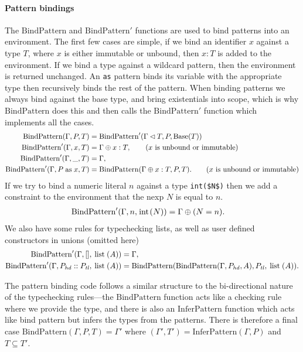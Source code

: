\paragraph{Pattern bindings} The $\mathrm{BindPattern}$ and $\mathrm{BindPattern}'$ functions are used to bind patterns into an environment. The first few cases are simple, if we bind an identifier $x$ against a type $T$, where $x$ is either immutable or unbound, then $x : T$ is added to the environment. If we bind a type against a wildcard pattern, then the environment is returned unchanged. An \lstinline+as+ pattern binds its variable with the appropriate type then recursively binds the rest of the pattern. When binding patterns we always bind against the base type, and bring existentials into scope, which is why $\mathrm{BindPattern}$ does this and then calls the $\mathrm{BindPattern}'$ function which implements all the cases.
\begin{align*}
  \mathrm{BindPattern}(\Gamma, P, T) &= \mathrm{BindPattern}'(\Gamma \lhd T, P, \mathrm{Base}(T))\\
  \mathrm{BindPattern}'(\Gamma, x, T) &= \Gamma \oplus x : T, \tag{$x$ is unbound or immutable}\\
  \mathrm{BindPattern}'(\Gamma, \msail{_}, T) &= \Gamma,\\
  \mathrm{BindPattern}'(\Gamma, \msail{$P\;$ as $\;x$}, T) &= \mathrm{BindPattern}(\Gamma \oplus x : T, P, T). \tag{$x$ is unbound or immutable}
\end{align*}
If we try to bind a numeric literal $n$ against a type
\lstinline[mathescape]+int($N$)+ then we add a constraint to the
environment that the nexp $N$ is equal to $n$.
\begin{align*}
\mathrm{BindPattern}'(\Gamma, n, \msail{int($N$)}) &= \Gamma \oplus (N = n).
\end{align*}
We also have some rules for typechecking lists, as well as user
defined constructors in unions (omitted here)
\begin{align*}
  \mathrm{BindPattern}'(\Gamma, [], \msail{list($A$)}) &= \Gamma,\\
  \mathrm{BindPattern}'(\Gamma, \msail{$P_{\mathit{hd}}\;$ :: $\;P_{\mathit{tl}}$}, \msail{list($A$)})
  &= \mathrm{BindPattern}(\mathrm{BindPattern}(\Gamma,P_{\mathit{hd}},A),P_{\mathit{tl}},\msail{list($A$)}).
\end{align*}

The pattern binding code follows a similar structure to the
bi-directional nature of the typechecking rules---the
$\mathrm{BindPattern}$ function acts like a checking rule where we
provide the type, and there is also an $\mathrm{InferPattern}$
function which acts like bind pattern but infers the types from the
patterns. There is therefore a final case
$\mathrm{BindPattern}(\Gamma, P, T) = \Gamma'$ where
$(\Gamma', T') = \mathrm{InferPattern}(\Gamma, P)$ and $T \subseteq T'$.


